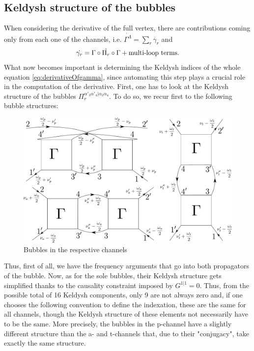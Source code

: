 \documentclass[12pt,a4paper,roman]{article}
\begin{document}
\subsection*{Keldysh structure of the bubbles}
When considering the derivative of the full vertex, there are contributions coming only from each one of the channels, i.e. $\dot{\Gamma^{\Lambda}} = \sum_r \dot{\gamma_r}$  and
\begin{equation}
\centering
\dot{\gamma_r} = \Gamma \circ \dot{\Pi_r} \circ \Gamma + \text{multi-loop terms}.
\label{eq:derivativeOfgamma}
\end{equation}
What now becomes important is determining the Keldysh indices of the whole equation \eqref{eq:derivativeOfgamma}, since automating this step plays a crucial role in the computation of the derivative.
First, one has to look at the Keldysh structure of the bubbles $\Pi_r^{\alpha'_3\alpha'_4|\alpha_3\alpha_4}$. To do so, we recur first to the following bubble structures:

\begin{figure}[H]
	\centering
	\includegraphics[width=\textwidth]{all-Bubbles.pdf}
	\caption{Bubbles in the respective channels}
\end{figure}




Thus, first of all, we have the frequency arguments that go into both propagators of  the bubble.  Now, as for the sole bubbles, their Keldysh structure gets simplified thanks to the causality constraint imposed by $G^{1|1}=0$. Thus, from the possible total of 16 Keldysh components, only 9 are not always zero and, if one chooses the following convention to define the indexation, these are the same for all channels, though the Keldysh structure of these elements not necessarily have to be the same. More precisely, the bubbles in the p-channel have a slightly different structure than the a- and t-channels that, due to their "conjugacy", take exactly the same structure.
\end{document}
